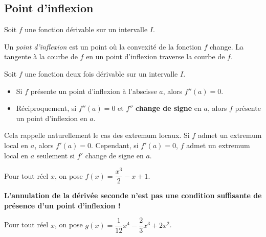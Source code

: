 \documentclass[11pt,fleqn, openany]{book} %
\begin{document}
\subsection{Point d'inflexion}

\begin{definition}Soit $f$ une fonction dérivable sur un intervalle $I$.

Un \textit{point d'inflexion} est un point où la convexité de la fonction $f$ change. La tangente à la courbe de $f$ en un point d'inflexion traverse la courbe de $f$.\end{definition}

\begin{proposition}Soit $f$ une fonction deux fois dérivable sur un intervalle $I$. 
\begin{itemize}
\item Si $f$ présente un point d'inflexion à l'abscisse $a$, alors $f''(a)=0$.
\item Réciproquement, si $f''(a)=0$ et $f''$ \textbf{change de signe} en $a$, alors $f$ présente un point d'inflexion en $a$.
\end{itemize}\end{proposition}

Cela rappelle naturellement le cas des extremum locaux. Si $f$ admet un extremum local en $a$, alors $f'(a)=0$. Cependant, si $f'(a)=0$, $f$ admet un extremum local en $a$ seulement si $f'$ change de signe en $a$.

\begin{example}Pour tout réel $x$, on pose $f(x)=\dfrac{x^3}{2}-x+1$. 



\end{example}

\textbf{L'annulation de la dérivée seconde n'est pas une condition suffisante de présence d'un point d'inflexion !}


\begin{example}Pour tout réel $x$, on pose $g(x)=\dfrac{1}{12}x^4-\dfrac{2}{3}x^3+2x^2$. 



\end{example}
\end{document}
